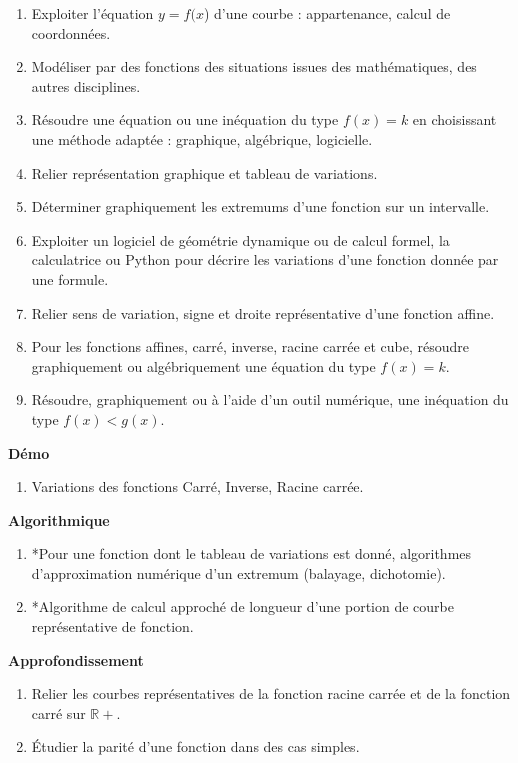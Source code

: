 \documentclass[10pt,a4paper]{article}
\begin{document}
\begin{enumerate}
\item Exploiter l'équation $y = f(x$) d'une courbe : appartenance, calcul de coordonnées.
\item Modéliser par des fonctions des situations issues des mathématiques, des autres 
disciplines.
\item  Résoudre une équation ou une inéquation du type $f(x) = k$ en choisissant une méthode adaptée : graphique, algébrique, logicielle.
\item Relier représentation graphique et tableau de variations.
\item  Déterminer graphiquement les extremums d'une fonction sur un intervalle.
\item  Exploiter un logiciel de géométrie dynamique ou de calcul formel, la calculatrice ou 
Python pour décrire les variations d'une fonction donnée par une formule.
\item  Relier sens de variation, signe et droite représentative d'une fonction affine.
\item  Pour les fonctions affines, carré, inverse, racine carrée et cube, résoudre 
graphiquement ou algébriquement une équation du type $f(x) = k$.
\item  Résoudre, graphiquement ou à l'aide d'un outil numérique, une inéquation du type $f(x) < g(x)$.
\end{enumerate}
 
\textbf{Démo}

\begin{enumerate}
\item Variations des fonctions Carré, Inverse, Racine carrée.
\end{enumerate}
 
\textbf{Algorithmique}

\begin{enumerate}
\item *Pour une fonction dont le tableau de variations est donné, algorithmes d'approximation numérique d'un extremum (balayage, dichotomie).
\item *Algorithme de calcul approché de longueur d'une portion de courbe représentative de fonction.
\end{enumerate}

\textbf{Approfondissement}

\begin{enumerate}
\item Relier les courbes représentatives de la fonction racine carrée et de la fonction carré sur $\mathbb R+$.
\item Étudier la parité d'une fonction dans des cas simples.
\end{enumerate}
\end{document}
